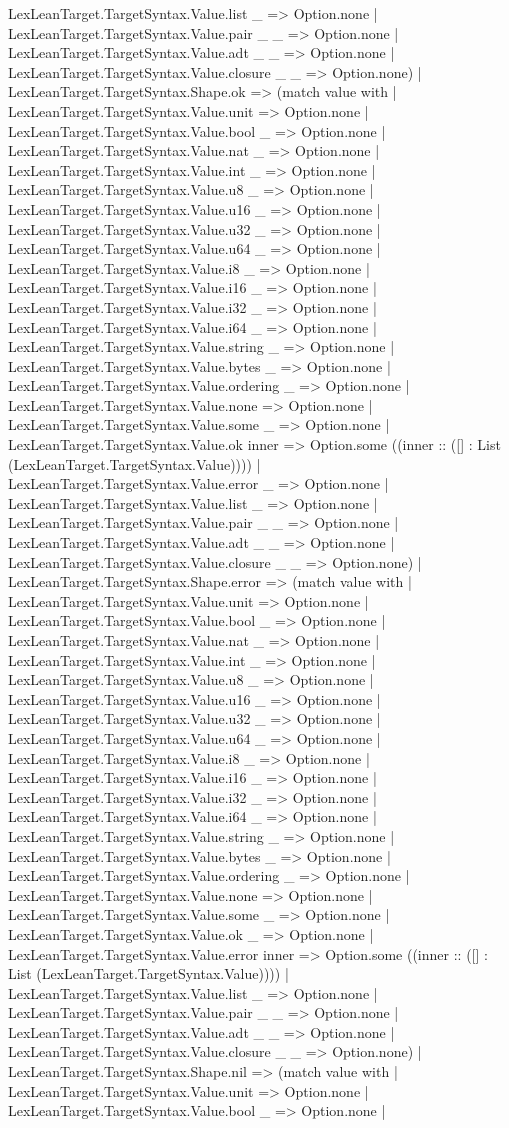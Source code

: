 \documentclass[11pt]{article}
\begin{document}
LexLeanTarget.TargetSyntax.Value.list \_ => Option.none | LexLeanTarget.TargetSyntax.Value.pair \_ \_ => Option.none | LexLeanTarget.TargetSyntax.Value.adt \_ \_ => Option.none | LexLeanTarget.TargetSyntax.Value.closure \_ \_ => Option.none) | LexLeanTarget.TargetSyntax.Shape.ok => (match value with | LexLeanTarget.TargetSyntax.Value.unit => Option.none | LexLeanTarget.TargetSyntax.Value.bool \_ => Option.none | LexLeanTarget.TargetSyntax.Value.nat \_ => Option.none | LexLeanTarget.TargetSyntax.Value.int \_ => Option.none | LexLeanTarget.TargetSyntax.Value.u8 \_ => Option.none | LexLeanTarget.TargetSyntax.Value.u16 \_ => Option.none | LexLeanTarget.TargetSyntax.Value.u32 \_ => Option.none | LexLeanTarget.TargetSyntax.Value.u64 \_ => Option.none | LexLeanTarget.TargetSyntax.Value.i8 \_ => Option.none | LexLeanTarget.TargetSyntax.Value.i16 \_ => Option.none | LexLeanTarget.TargetSyntax.Value.i32 \_ => Option.none | LexLeanTarget.TargetSyntax.Value.i64 \_ => Option.none | LexLeanTarget.TargetSyntax.Value.string \_ => Option.none | LexLeanTarget.TargetSyntax.Value.bytes \_ => Option.none | LexLeanTarget.TargetSyntax.Value.ordering \_ => Option.none | LexLeanTarget.TargetSyntax.Value.none => Option.none | LexLeanTarget.TargetSyntax.Value.some \_ => Option.none | LexLeanTarget.TargetSyntax.Value.ok inner => Option.some ((inner :: ([] : List (LexLeanTarget.TargetSyntax.Value)))) | LexLeanTarget.TargetSyntax.Value.error \_ => Option.none | LexLeanTarget.TargetSyntax.Value.list \_ => Option.none | LexLeanTarget.TargetSyntax.Value.pair \_ \_ => Option.none | LexLeanTarget.TargetSyntax.Value.adt \_ \_ => Option.none | LexLeanTarget.TargetSyntax.Value.closure \_ \_ => Option.none) | LexLeanTarget.TargetSyntax.Shape.error => (match value with | LexLeanTarget.TargetSyntax.Value.unit => Option.none | LexLeanTarget.TargetSyntax.Value.bool \_ => Option.none | LexLeanTarget.TargetSyntax.Value.nat \_ => Option.none | LexLeanTarget.TargetSyntax.Value.int \_ => Option.none | LexLeanTarget.TargetSyntax.Value.u8 \_ => Option.none | LexLeanTarget.TargetSyntax.Value.u16 \_ => Option.none | LexLeanTarget.TargetSyntax.Value.u32 \_ => Option.none | LexLeanTarget.TargetSyntax.Value.u64 \_ => Option.none | LexLeanTarget.TargetSyntax.Value.i8 \_ => Option.none | LexLeanTarget.TargetSyntax.Value.i16 \_ => Option.none | LexLeanTarget.TargetSyntax.Value.i32 \_ => Option.none | LexLeanTarget.TargetSyntax.Value.i64 \_ => Option.none | LexLeanTarget.TargetSyntax.Value.string \_ => Option.none | LexLeanTarget.TargetSyntax.Value.bytes \_ => Option.none | LexLeanTarget.TargetSyntax.Value.ordering \_ => Option.none | LexLeanTarget.TargetSyntax.Value.none => Option.none | LexLeanTarget.TargetSyntax.Value.some \_ => Option.none | LexLeanTarget.TargetSyntax.Value.ok \_ => Option.none | LexLeanTarget.TargetSyntax.Value.error inner => Option.some ((inner :: ([] : List (LexLeanTarget.TargetSyntax.Value)))) | LexLeanTarget.TargetSyntax.Value.list \_ => Option.none | LexLeanTarget.TargetSyntax.Value.pair \_ \_ => Option.none | LexLeanTarget.TargetSyntax.Value.adt \_ \_ => Option.none | LexLeanTarget.TargetSyntax.Value.closure \_ \_ => Option.none) | LexLeanTarget.TargetSyntax.Shape.nil => (match value with | LexLeanTarget.TargetSyntax.Value.unit => Option.none | LexLeanTarget.TargetSyntax.Value.bool \_ => Option.none | 
\end{document}
